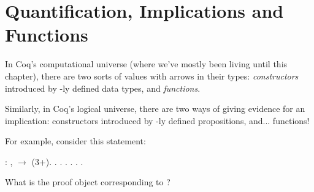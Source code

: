 \documentclass[12pt]{report}
\begin{document}
\section{Quantification, Implications and Functions}



 In Coq's computational universe (where we've mostly been living
    until this chapter), there are two sorts of values with arrows in
    their types: \textit{constructors} introduced by -ly defined
    data types, and \textit{functions}.


    Similarly, in Coq's logical universe, there are two ways of giving
    evidence for an implication: constructors introduced by
    -ly defined propositions, and... functions!


    For example, consider this statement: \begin{coqdoccode}
\coqdocemptyline
\coqdocnoindent
{} : \coqdockw{\ensuremath{\forall}} ,   \ensuremath{\rightarrow}  (3+).\coqdoceol
\coqdocnoindent
{}.\coqdoceol
\coqdocindent{1.50em}
  .\coqdoceol
\coqdocindent{1.50em}
 .\coqdoceol
\coqdocindent{1.50em}
 .\coqdoceol
\coqdocindent{1.50em}
 .\coqdoceol
\coqdocnoindent
{}.\coqdoceol
\coqdocemptyline
\end{coqdoccode}
What is the proof object corresponding to ? 
\end{document}
